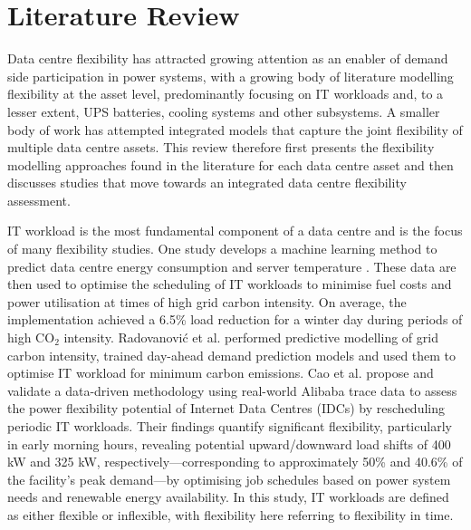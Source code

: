 \documentclass[lettersize,journal]{IEEEtran}
\providecommand{\DIFadd}[1]{{\color{blue}#1}}
\providecommand{\DIFaddbegin}{}
\providecommand{\DIFaddend}{}
\begin{document}
\section{Literature Review}\DIFaddbegin \label{sec:literature}

\DIFaddend 

 \DIFaddbegin \DIFadd{Data centre flexibility has attracted growing attention as an enabler of demand side participation in power systems, with a growing body of literature modelling flexibility at the asset level, predominantly focusing }\DIFaddend on IT workloads  \DIFaddbegin \DIFadd{and, to a lesser extent, }\DIFaddend UPS batteries,  \DIFaddbegin \DIFadd{cooling systems and other subsystems. A smaller body of work has attempted integrated models that capture the joint flexibility of multiple data centre assets. This review therefore first presents }\DIFaddend the flexibility modelling approaches found in the literature for each  \DIFaddbegin \DIFadd{data centre asset and then discusses studies that move towards an integrated data centre flexibility assessment}\DIFaddend .

IT workload is the most fundamental component of a  \DIFaddbegin \DIFadd{data centre }\DIFaddend and is the focus  \DIFaddbegin \DIFadd{of }\DIFaddend many flexibility studies. One study develops a machine learning method to predict  \DIFaddbegin \DIFadd{data centre }\DIFaddend energy consumption and server temperature  \DIFaddbegin \DIFadd{\cite{Misaghian2023TIA}}\DIFaddend . These data are then used to optimise the scheduling of IT workloads to minimise fuel costs and power utilisation at times of high grid carbon intensity. On average, the implementation achieved a 6.5\% load reduction for a winter day during periods of high CO$_2$ intensity. Radovanović et al. \cite{radovanovic2022carbon}  performed predictive modelling of grid carbon intensity, trained day-ahead demand prediction models and used them to optimise IT workload for minimum carbon emissions.
Cao et al.  \DIFaddbegin \DIFadd{\cite{Cao2022ApEn} }\DIFaddend propose and validate a data-driven methodology using real-world Alibaba trace data to assess the power flexibility potential of Internet Data Centres (IDCs) by rescheduling periodic IT workloads. Their findings quantify significant flexibility, particularly in early morning hours, revealing potential upward/downward load shifts of  \DIFaddbegin \DIFadd{400 kW and 325 kW}\DIFaddend , respectively—corresponding to approximately 50\% and 40.6\% of the facility's peak demand—by optimising job schedules based on power system needs and renewable energy availability. In this study, IT workloads are defined as either flexible or inflexible, with flexibility here referring to flexibility in time.
\end{document}
